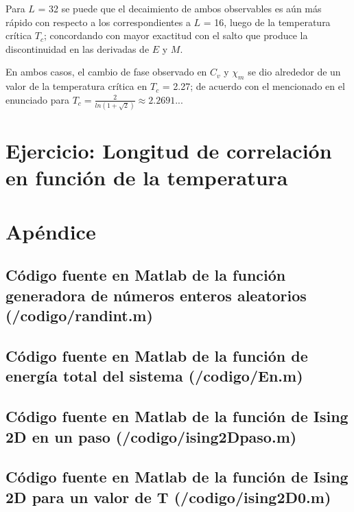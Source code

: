 \documentclass[a4paper,12pt]{article}
\begin{document}
Para $L$ = 32 se puede que el decaimiento de ambos observables es a\'un m\'as r\'apido con respecto a los correspondientes a $L$ = 16, luego de la temperatura cr\'itica $T_{c}$; concordando con mayor exactitud con el salto que produce la discontinuidad en las derivadas de $E$ y $M$.

En ambos casos, el cambio de fase observado en $C_{v}$ y $\chi_{m}$ se dio alrededor de un valor de la temperatura cr\'itica en $T_{c}$ = 2.27; de acuerdo con el mencionado en el enunciado para $T_{c} = \frac{2}{ln(1+\sqrt{2})} \approx 2.2691...$


\section{Ejercicio: Longitud de correlaci\'on en funci\'on de la temperatura}


\section{Ap\'endice}

\subsection{C\'odigo fuente en Matlab de la funci\'on generadora de n\'umeros enteros aleatorios (/codigo/randint.m)}



\subsection{C\'odigo fuente en Matlab de la funci\'on de energ\'ia total del sistema (/codigo/En.m)}



\subsection{C\'odigo fuente en Matlab de la funci\'on de Ising 2D en un paso (/codigo/ising2Dpaso.m)}



\subsection{C\'odigo fuente en Matlab de la funci\'on de Ising 2D para un valor de T (/codigo/ising2D0.m)}
\end{document}
